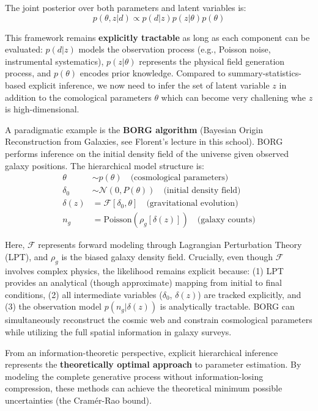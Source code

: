 \documentclass{SciPost}
\begin{document}
The joint posterior over both parameters and latent variables is:
\begin{equation}
    p(\theta, z|d) \propto p(d|z)p(z|\theta)p(\theta)
\end{equation}

This framework remains \textbf{explicitly tractable} as long as each component can be evaluated: $p(d|z)$ models the observation process (e.g., Poisson noise, instrumental systematics), $p(z|\theta)$ represents the physical field generation process, and $p(\theta)$ encodes prior knowledge. Compared to summary-statistics-based explicit inference, we now need to infer the set of latent variable $z$ in addition to the comological parameters $\theta$ which can become very challening whe $z$ is high-dimensional. 

A paradigmatic example is the \textbf{BORG algorithm} (Bayesian Origin Reconstruction from Galaxies, see Florent's lecture in this school). BORG performs inference on the initial density field of the universe given observed galaxy positions. The hierarchical model structure is:
\begin{align}
    \theta &\sim p(\theta) \quad \text{(cosmological parameters)} \\
    \delta_0 &\sim \mathcal{N}(0, P(\theta)) \quad \text{(initial density field)} \\
    \delta(z) &= \mathcal{F}[\delta_0, \theta] \quad \text{(gravitational evolution)} \\
    n_g &= \text{Poisson}(\rho_g[\delta(z)]) \quad \text{(galaxy counts)}
\end{align}

Here, $\mathcal{F}$ represents forward modeling through Lagrangian Perturbation Theory (LPT), and $\rho_g$ is the biased galaxy density field. Crucially, even though $\mathcal{F}$ involves complex physics, the likelihood remains explicit because: (1) LPT provides an analytical (though approximate) mapping from initial to final conditions, (2) all intermediate variables ($\delta_0$, $\delta(z)$) are tracked explicitly, and (3) the observation model $p(n_g|\delta(z))$ is analytically tractable. BORG can simultaneously reconstruct the cosmic web and constrain cosmological parameters while utilizing the full spatial information in galaxy surveys.

From an information-theoretic perspective, explicit hierarchical inference represents the \textbf{theoretically optimal approach} to parameter estimation. By modeling the complete generative process without information-losing compression, these methods can achieve the theoretical minimum possible uncertainties (the Cramér-Rao bound). 
\end{document}
